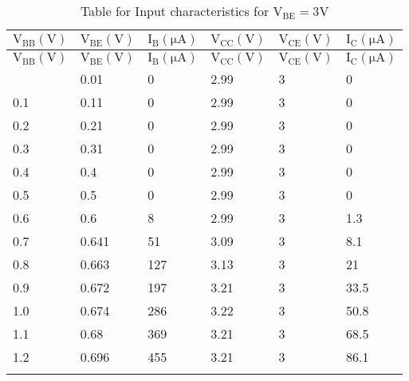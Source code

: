 \documentclass[12pt]{article}
\begin{document}
\begin{longtable}{|l|l|l|l|l|l|}
	\hline
    $\mathrm{V_{BB}(V)}$ & $\mathrm{V_{BE}(V)}$ & $\mathrm{I_{B}(\mu A)}$  & $\mathrm{V_{CC}(V)}$  & $\mathrm{V_{CE}(V)}$ & $\mathrm{I_{C}(\mu A)}$  \\ \hline
	\endfirsthead
	\hline
    $\mathrm{V_{BB}(V)}$ & $\mathrm{V_{BE}(V)}$ & $\mathrm{I_{B}(\mu A)}$  & $\mathrm{V_{CC}(V)}$  & $\mathrm{V_{CE}(V)}$ & $\mathrm{I_{C}(\mu A)}$  \\ \hline
	\endhead
	\hline
	\endfoot
	
	\endlastfoot
    0.01 & 0.01  & 0   & 2.99  & 3  & 0   \\ \hline
    0.1  & 0.11  & 0   & 2.99  & 3  & 0   \\ \hline
    0.2  & 0.21  & 0   & 2.99  & 3  & 0   \\ \hline
    0.3  & 0.31  & 0   & 2.99  & 3  & 0   \\ \hline
    0.4  & 0.4   & 0   & 2.99  & 3  & 0   \\ \hline
    0.5  & 0.5   & 0   & 2.99  & 3  & 0   \\ \hline
    0.6  & 0.6   & 8   & 2.99  & 3  & 1.3 \\ \hline
    0.7  & 0.641 & 51  & 3.09  & 3  & 8.1 \\ \hline
    0.8  & 0.663 & 127 & 3.13  & 3  & 21  \\ \hline
    0.9  & 0.672 & 197 & 3.21  & 3  & 33.5 \\ \hline
    1.0  & 0.674 & 286 & 3.22  & 3  & 50.8 \\ \hline
    1.1  & 0.68  & 369 & 3.21  & 3  & 68.5 \\ \hline
    1.2  & 0.696 & 455 & 3.21  & 3  & 86.1 \\ \hline
\caption{Table for Input characteristics for $\mathrm{V_{BE}=3V}$}
\end{longtable}
\end{document}
